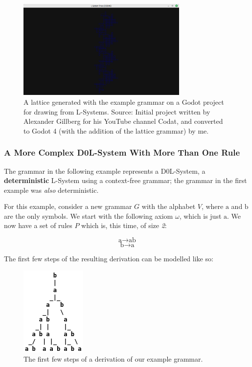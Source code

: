 \begin{figure}[H]
    \centering
    \includegraphics[width=0.75\textwidth]{Images/gd4lattice.png}
    \caption{A lattice generated with the example grammar on a Godot project for drawing from L-Systems. Source: Initial project written by Alexander Gillberg for his YouTube channel Codat\cite{codatGD3LSystemYT}\cite{codatGD3LSystemGH}, and converted to Godot 4 (with the addition of the lattice grammar) by me.\cite{codatGD4LSystemGH}}
    \label{fig:lattice2}
\end{figure}

\subsubsection{A More Complex D0L-System With More Than One Rule} \label{lcomplex}

The grammar in the following example represents a D0L-System\cite{lsystemintro}, a \textbf{deterministic} L-System using a context-free grammar; the grammar in the first example was \textit{also} deterministic.

\newcommand{\A}{\mbox{a}}
\newcommand{\B}{\mbox{b}}

For this example, consider a new grammar $G$ with the alphabet $V$, where $\A$ and $\B$ are the only symbols. We start with the following axiom $\omega$, which is just $\A$. We now have a set of rules $P$ which is, this time, of size \textit{2}:

$$ \A \rightarrow \A\B $$
$$ \B \rightarrow \A $$

The first few steps of the resulting derivation can be modelled like so:

\begin{figure}[H]
    \centering
    \includegraphics[scale=0.5]{Images/derivationtree.png}
    \caption{The first few steps of a derivation of our example grammar.\cite{lsystemintro}}
    \label{fig:derivationtree}
\end{figure}

